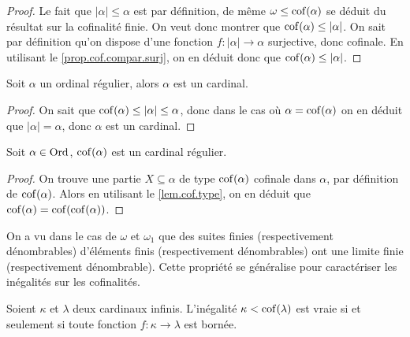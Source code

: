 \begin{proof}
  Le fait que $|\alpha|\leq \alpha$ est par définition, de même
  $\omega\leq\operatorname{cof}(\alpha)$ se déduit du résultat sur la cofinalité finie. On
  veut donc montrer que $\operatorname{cof}(\alpha) \leq|\alpha|$. On sait par définition
  qu'on dispose d'une fonction $f : |\alpha|\to \alpha$ surjective, donc
  cofinale. En utilisant le \cref{prop.cof.compar.surj}, on en déduit donc que
  $\operatorname{cof}(\alpha)\leq|\alpha|$.
\end{proof}

\begin{property}
  Soit $\alpha$ un ordinal régulier, alors $\alpha$ est un cardinal.
\end{property}

\begin{proof}
  On sait que $\operatorname{cof}(\alpha) \leq |\alpha| \leq \alpha$, donc dans le cas où
  $\alpha = \operatorname{cof}(\alpha)$ on en déduit que $|\alpha| = \alpha$, donc $\alpha$
  est un cardinal.
\end{proof}

\begin{property}
  Soit $\alpha\in\operatorname{Ord}$, $\operatorname{cof}(\alpha)$ est un cardinal régulier.
\end{property}

\begin{proof}
  On trouve une partie $X\subseteq\alpha$ de type $\operatorname{cof}(\alpha)$ cofinale dans
  $\alpha$, par définition de $\operatorname{cof}(\alpha)$. Alors en utilisant le
  \cref{lem.cof.type}, on en déduit que $\operatorname{cof}(\alpha) = \operatorname{cof}(\operatorname{cof}(\alpha))$.
\end{proof}

On a vu dans le cas de $\omega$ et $\omega_1$ que des suites finies
(respectivement dénombrables) d'éléments finis (respectivement dénombrables)
ont une limite finie (respectivement dénombrable). Cette propriété se généralise
pour caractériser les inégalités sur les cofinalités.

\begin{proposition}\label{prop.ineg.bounded}
  Soient $\kappa$ et $\lambda$ deux cardinaux infinis. L'inégalité
  $\kappa < \operatorname{cof}(\lambda)$ est vraie si et seulement si toute fonction
  $f : \kappa \to \lambda$ est bornée.
\end{proposition}


